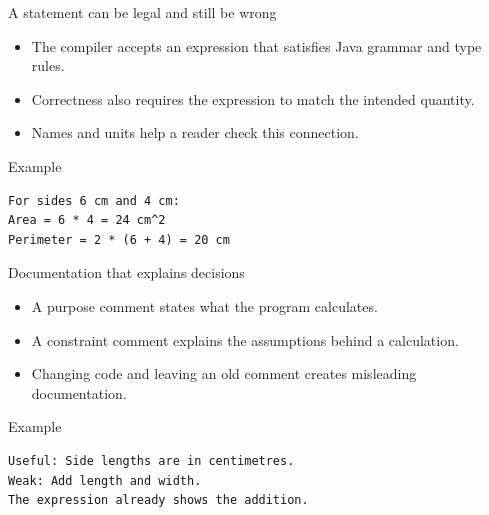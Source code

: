 \documentclass[10pt,aspectratio=169]{beamer}
\begin{document}
\begin{frame}[fragile,t]{A statement can be legal and still be wrong}
\begin{itemize}
\item The compiler accepts an expression that satisfies Java grammar and type rules.
\item Correctness also requires the expression to match the intended quantity.
\item Names and units help a reader check this connection.
\end{itemize}
\vspace{1mm}\begin{block}{Example}
\begin{lstlisting}
For sides 6 cm and 4 cm:
Area = 6 * 4 = 24 cm^2
Perimeter = 2 * (6 + 4) = 20 cm
\end{lstlisting}
\end{block}
\end{frame}

\begin{frame}[fragile,t]{Documentation that explains decisions}
\begin{itemize}
\item A purpose comment states what the program calculates.
\item A constraint comment explains the assumptions behind a calculation.
\item Changing code and leaving an old comment creates misleading documentation.
\end{itemize}
\vspace{1mm}\begin{block}{Example}
\begin{lstlisting}
Useful: Side lengths are in centimetres.
Weak: Add length and width.
The expression already shows the addition.
\end{lstlisting}
\end{block}
\end{frame}
\end{document}
